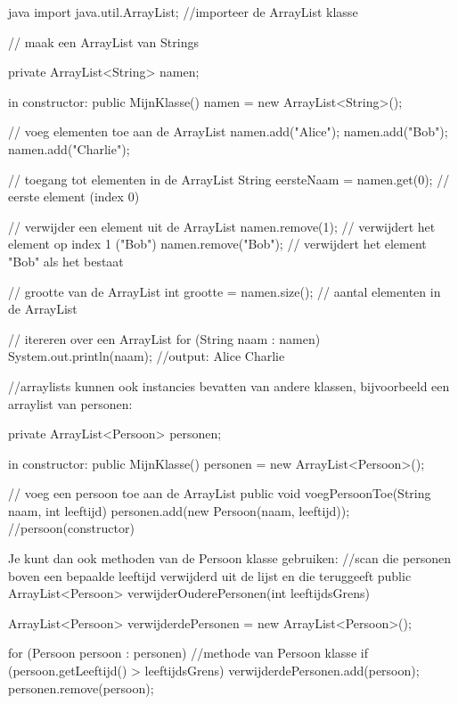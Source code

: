 \documentclass[a4paper,11pt]{article}
\begin{document}
\begin{codeblock}[arraylist]{java}
    import java.util.ArrayList; //importeer de ArrayList klasse

    // maak een ArrayList van Strings

    private ArrayList<String> namen;

    in constructor:
        public MijnKlasse() 
        {
            namen = new ArrayList<String>();
        }

    // voeg elementen toe aan de ArrayList
    namen.add("Alice");
    namen.add("Bob");
    namen.add("Charlie");

    // toegang tot elementen in de ArrayList
    String eersteNaam = namen.get(0); // eerste element (index 0)

    // verwijder een element uit de ArrayList
    namen.remove(1); // verwijdert het element op index 1 ("Bob")
    namen.remove("Bob"); // verwijdert het element "Bob" als het bestaat

    // grootte van de ArrayList
    int grootte = namen.size(); // aantal elementen in de ArrayList

    // itereren over een ArrayList
    for (String naam : namen) 
    {
        System.out.println(naam);
        //output: Alice Charlie
    }

    //arraylists kunnen ook instancies bevatten van
    andere klassen,
    bijvoorbeeld een arraylist van personen:

    private ArrayList<Persoon> personen;

    in constructor:
        public MijnKlasse() 
        {
            personen = new ArrayList<Persoon>();
        }

    // voeg een persoon toe aan de ArrayList
    public void voegPersoonToe(String naam, int leeftijd) 
    {
    personen.add(new Persoon(naam, leeftijd)); //persoon(constructor)
    }

    Je kunt dan ook methoden van de Persoon klasse gebruiken:
    //scan die personen boven een bepaalde leeftijd verwijderd 
    uit de lijst en die teruggeeft
    public ArrayList<Persoon> verwijderOuderePersonen(int leeftijdsGrens) 
    {
        ArrayList<Persoon> verwijderdePersonen = new ArrayList<Persoon>();

        for (Persoon persoon : personen) 
        {
            //methode van Persoon klasse
            if (persoon.getLeeftijd() > leeftijdsGrens) 
            {
                verwijderdePersonen.add(persoon);
                personen.remove(persoon);
            }
        }
    }
\end{codeblock}
\end{document}
